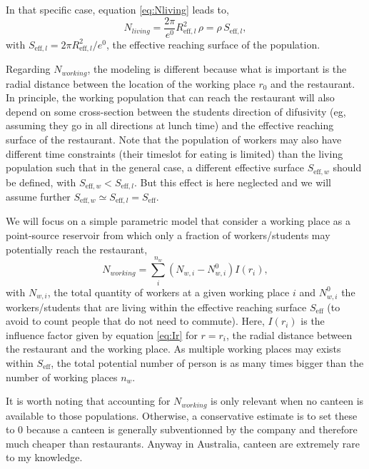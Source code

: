 \documentclass{article}
\begin{document}
In that specific case, equation \ref{eq:Nliving} leads to,
\begin{equation}
    N_{living} = \frac{2\pi}{e^0} R_{\mathrm{eff},l}^2 \, \rho = \rho \, S_{\mathrm{eff},l},
\end{equation}
with $S_{\mathrm{eff},l} = 2\pi R_{\mathrm{eff},l}^2 / e^0$, the effective reaching surface of the population.

Regarding $N_{working}$, the modeling is different because what is important is the radial distance between the location of the working place $r_0$ and the restaurant. In principle, the working population that can reach the restaurant will also depend on some cross-section between the students direction of difusivity (eg, assuming they go in all directions at lunch time) and the effective reaching surface of the restaurant. Note that the population of workers may also have different time constraints (their timeslot for eating is limited) than the living population such that in the general case, a different effective surface $S_{\mathrm{eff},w}$ should be defined, with $S_{\mathrm{eff},w} < S_{\mathrm{eff},l}$. But this effect is here neglected and we will assume further  $S_{\mathrm{eff},w} \simeq S_{\mathrm{eff},l} = S_{\mathrm{eff}}$. 

We will focus on a simple parametric model that consider a working place as a point-source reservoir from which only a fraction of workers/students may potentially reach the restaurant,
\begin{equation} \label{eq:Nwork}
    N_{working} = \sum^{n_w}_i (N_{w,i} - N^{0}_{w,i}) I(r_i),
\end{equation}
with $N_{w,i}$, the total quantity of workers at a given working place $i$ and $ N^{0}_{w,i}$ the workers/students that are living within the effective reaching surface $S_{\mathrm{eff}}$ (to avoid to count people that do not need to commute). Here, $I(r_i)$ is the influence factor given by equation \ref{eq:Ir} for $r=r_i$, the radial distance between the restaurant and the working place. As multiple working places may exists within $S_{\mathrm{eff}}$, the total potential number of person is as many times bigger than the number of working places $n_w$.

It is worth noting that accounting for $N_{working}$ is only relevant when no canteen is available to those populations. Otherwise, a conservative estimate is to set these to 0 because a canteen is generally subventionned by the company and therefore much cheaper than restaurants. Anyway in Australia, canteen are extremely rare to my knowledge.
\end{document}
